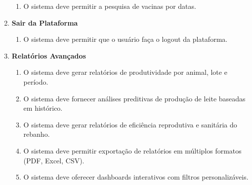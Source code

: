 \documentclass[12pt, a4paper]{article}
\begin{document}
\begin{spacing}{1.5}
\begin{spacing}{1.5}
\begin{enumerate}[label=RF0\arabic{*}.]
\begin{enumerate}[label=RF9.0\arabic{*}]
        \item O sistema deve permitir a pesquisa de vacinas por datas.
    \end{enumerate}
    \item \textbf{Sair da Plataforma}
    \begin{enumerate}[label=RF10.0\arabic{*}]
        \item O sistema deve permitir que o usuário faça o logout da plataforma.
    \end{enumerate}
    \item \textbf{Relatórios Avançados}
    \begin{enumerate}[label=RF11.0\arabic{*}]
        \item O sistema deve gerar relatórios de produtividade por animal, lote e período.
        \item O sistema deve fornecer análises preditivas de produção de leite baseadas em histórico.
        \item O sistema deve gerar relatórios de eficiência reprodutiva e sanitária do rebanho.
        \item O sistema deve permitir exportação de relatórios em múltiplos formatos (PDF, Excel, CSV).
        \item O sistema deve oferecer dashboards interativos com filtros personalizáveis.
    \end{enumerate}
\end{enumerate}
\end{spacing}


\end{spacing}
\end{document}
